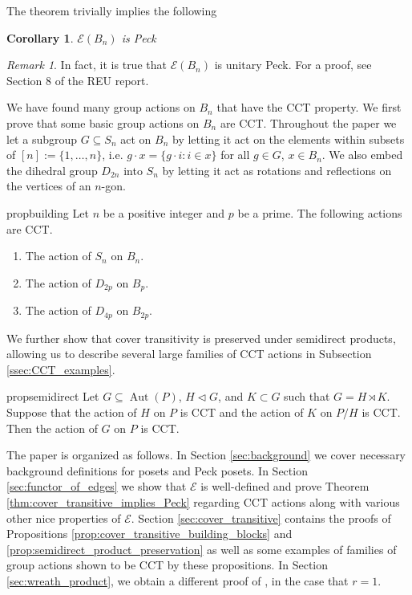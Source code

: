 \documentclass[smallextended, envcountsame, numbook]{svjour3}
\theoremstyle{plain}
\newtheorem{cor}[thm]{Corollary}
\theoremstyle{definition}
\theoremstyle{remark}
\newtheorem{rmk}[thm]{Remark}
\numberwithin{equation}{section}
\newcommand\Aut{\operatorname{Aut}}
\begin{document}
The theorem trivially implies the following
\begin{cor}
	$\mathcal E(B_n)$ is Peck
\end{cor}

\begin{rmk}
	 In fact, it is true that $\mathcal E(B_n)$ is unitary Peck. For a proof, see Section 8 of the REU report. 
 \end{rmk}



We have found many group actions on $B_n$ that have the CCT property.  We first prove that some basic group actions on $B_n$ are CCT.  Throughout the paper we let a subgroup $G\subseteq S_n$ act on $B_n$ by letting it act on the elements within subsets of $[n]:= \{1,\ldots, n\}$, i.e. $g\cdot x = \{g\cdot i\colon i\in x\}$  for all $g\in G$, $x\in B_n$.  We also embed the dihedral group $D_{2n}$ into $S_n$ by letting it act as rotations and reflections on the vertices of an $n$-gon.

\begin{restatable}{prop}{building}
\label{prop:cover_transitive_building_blocks}
 Let $n$ be a positive integer and $p$ be a prime.  The following actions are CCT.
\begin{enumerate}
\item The action of $S_n$ on $B_n$.
\item The action of $D_{2p}$ on $B_p$.
\item The action of $D_{4p}$ on $B_{2p}$.
\end{enumerate} 
\end{restatable}

We further show that cover transitivity is preserved under semidirect products, allowing us to describe several large families of CCT actions in Subsection \ref{ssec:CCT_examples}.

\begin{restatable}{prop}{semidirect}
\label{prop:semidirect_product_preservation}
Let $G\subseteq \Aut(P)$, $H\triangleleft G$, and $K\subset G$ such that $G = H\rtimes K$.  Suppose that the action of $H$ on $P$ is CCT and the action of $K$ on $P/H$ is CCT. Then the action of $G$ on $P$ is CCT.
\end{restatable}

The paper is organized as follows. In Section \ref{sec:background} we cover necessary background definitions for posets and Peck posets.  In Section \ref{sec:functor_of_edges} we show that $\mathcal E$ is well-defined and prove Theorem \ref{thm:cover_transitive_implies_Peck} regarding CCT actions along with various other nice properties of $\mathcal E$. Section \ref{sec:cover_transitive} contains the proofs of Propositions \ref{prop:cover_transitive_building_blocks} and \ref{prop:semidirect_product_preservation} as well as some examples of families of group actions shown to be CCT by these propositions. In Section \ref{sec:wreath_product}, we obtain a different proof of \cite[Theorem 1.1]{pak}, in the case that $r = 1$.
\end{document}

